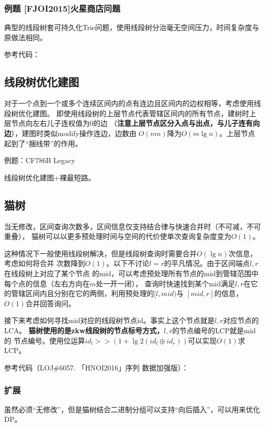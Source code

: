 \subsubsection{例题 [FJOI2015]火星商店问题}
典型的线段树套可持久化Trie问题，使用线段树分治毫无空间压力，时间复杂度与原做法相同。

参考代码：

\subsection{线段树优化建图}
对于一个点到一个或多个连续区间内的点有连边且区间内的边权相等，考虑使用线段树优化建图。
即使用线段树的上层节点代表管辖区间内的所有节点，建树时上层节点向左右儿子连权值为0的边
（{\bfseries 注意上层节点区分入点与出点，与儿子连有向边}），建图时类似modify操作连边，边数由
$O(mn)$降为$O(m\lg n)$。上层节点起到了``捆线带''的作用。

例题：CF786B Legacy

线段树优化建图+裸最短路。


\subsection{猫树}
当无修改，区间查询次数多，区间信息仅支持结合律与快速合并时（不可减，不可重叠），
猫树可以以更多预处理时间与空间的代价使单次查询复杂度变为$O(1)$。

这种情况下一般使用线段树解决，但是线段树查询时需要合并$O(\lg n)$次信息，考虑如何将合并
次数降到$O(1)$。以下不讨论$l=r$的平凡情况。由于区间端点$l,r$在线段树上对应了某个节点
的mid，可以考虑预处理所有节点的mid到管辖范围中每个点的信息（左右方向在$m$处一开一闭），
查询时快速找到某个mid满足$l,r$在它的管辖区间内且分别在它的两侧，利用预处理的$[l,mid)$与
$[mid,r]$的信息，$O(1)$合并回答询问。

接下来考虑如何寻找mid对应的线段树节点id。事实上这个节点就是$l,r$对应节点的LCA。
{\bfseries 猫树使用的是zkw线段树的节点标号方式，}$l,r$的节点编号的LCP就是mid的
节点编号。使用位运算$id_l>>(1+\lg2(id_l\oplus id_r))$可以实现$O(1)$求LCP。

参考代码（LOJ\#6057. 「HNOI2016」序列 数据加强版）：


\subsubsection{扩展}
虽然必须``无修改''，但是猫树结合二进制分组可以支持``向后插入''，可以用来优化DP。

